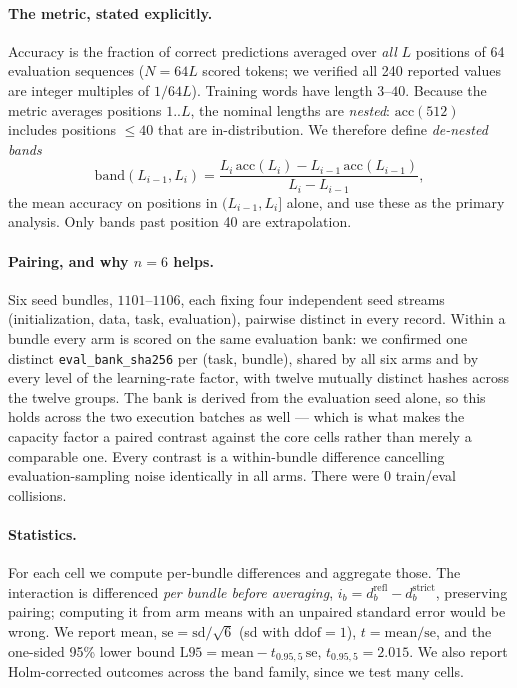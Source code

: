 \documentclass[10pt,twocolumn]{article}
\begin{document}
\paragraph{The metric, stated explicitly.}
Accuracy is the fraction of correct predictions averaged over \emph{all} $L$
positions of 64 evaluation sequences ($N = 64L$ scored tokens; we verified all
240 reported values are integer multiples of $1/64L$). Training words have
length $3$--$40$. Because the metric averages positions $1..L$, the nominal
lengths are \emph{nested}: $\mathrm{acc}(512)$ includes positions $\le 40$ that
are in-distribution. We therefore define \emph{de-nested bands}
\begin{equation}
\label{eq:denest}
\mathrm{band}(L_{i-1},L_i) =
\frac{L_i\,\mathrm{acc}(L_i) - L_{i-1}\,\mathrm{acc}(L_{i-1})}{L_i - L_{i-1}},
\end{equation}
the mean accuracy on positions in $(L_{i-1}, L_i]$ alone, and use these as the
primary analysis. Only bands past position 40 are extrapolation.

\paragraph{Pairing, and why $n=6$ helps.}
Six seed bundles, $1101$--$1106$, each fixing four independent seed streams
(initialization, data, task, evaluation), pairwise distinct in every record.
Within a bundle every arm is scored on the same evaluation bank: we confirmed
one distinct \texttt{eval\_bank\_sha256} per (task, bundle), shared by all six
arms and by every level of the learning-rate factor, with twelve mutually
distinct hashes across the twelve groups. The bank is derived from the
evaluation seed alone, so this holds across the two execution batches as well ---
which is what makes the capacity factor a paired contrast against the core cells
rather than merely a comparable one.
Every contrast is a within-bundle difference cancelling evaluation-sampling
noise identically in all arms. There were $0$ train/eval collisions.

\paragraph{Statistics.}
For each cell we compute per-bundle differences and aggregate those. The
interaction is differenced \emph{per bundle before averaging},
$i_b = d_b^{\text{refl}} - d_b^{\text{strict}}$, preserving pairing; computing
it from arm means with an unpaired standard error would be wrong. We report
mean, $\mathrm{se}=\mathrm{sd}/\sqrt6$ (sd with $\mathrm{ddof}=1$),
$t=\mathrm{mean}/\mathrm{se}$, and the one-sided 95\% lower bound
$\mathrm{L95}=\mathrm{mean}-t_{0.95,5}\,\mathrm{se}$, $t_{0.95,5}=2.015$. We
also report Holm-corrected outcomes across the band family, since we test many
cells.
\end{document}
